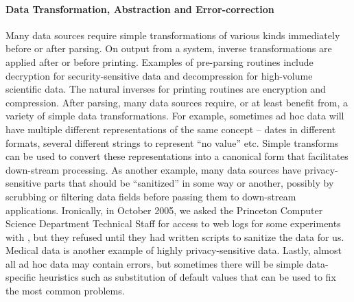 \documentclass[11pt]{article}
\begin{document}
\paragraph*{Data Transformation, Abstraction and Error-correction}
Many data sources require simple transformations of various kinds
immediately before or after parsing.  On output from a system,
inverse transformations are applied after or before printing.  
Examples of pre-parsing routines include decryption for
security-sensitive data and decompression for high-volume scientific data.  
The natural inverses for printing routines are encryption and compression.
After parsing, many data sources require, or at least benefit from,
a variety of simple data transformations.  For example,
sometimes ad hoc data will have multiple different representations
of the same concept -- dates in different formats, several different strings
to represent ``no value'' etc.  Simple transforms can be used to convert
these representations into a canonical form that facilitates down-stream
processing.  As another example, many data sources have privacy-sensitive parts
that should be ``sanitized'' in some way or another, possibly by scrubbing or
filtering data fields before passing them to down-stream applications.
Ironically, in October 2005, we asked the Princeton Computer Science
Department Technical Staff for access to web logs for some experiments
with \pads, but they refused until they had written scripts to
sanitize the data for us.  Medical data is another example of highly
privacy-sensitive data.
Lastly, almost all ad hoc data may contain errors, but sometimes there will be simple data-specific heuristics such as substitution of default values
that can be used to fix the most common problems.
\end{document}
